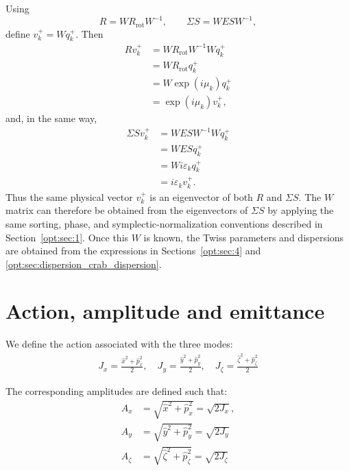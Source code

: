 Using
\begin{equation}
R = W R_{\mathrm{rot}} W^{-1}, \qquad \Sigma S = W E S W^{-1},
\end{equation}
define $v_k^+=W q_k^+$. Then
\begin{align}
R v_k^+
&= W R_{\mathrm{rot}} W^{-1} W q_k^+ \nonumber\\
&= W R_{\mathrm{rot}} q_k^+ \nonumber\\
&= W \exp(i\mu_k) q_k^+ \nonumber\\
&= \exp(i\mu_k) v_k^+,
\end{align}
and, in the same way,
\begin{align}
\Sigma S v_k^+
&= W E S W^{-1} W q_k^+ \nonumber\\
&= W E S q_k^+ \nonumber\\
&= W i\varepsilon_k q_k^+ \nonumber\\
&= i\varepsilon_k v_k^+.
\end{align}
Thus the same physical vector $v_k^+$ is an eigenvector of both $R$ and
$\Sigma S$. The $W$ matrix can therefore be obtained from the eigenvectors of
$\Sigma S$ by applying the same sorting, phase, and symplectic-normalization
conventions described in Section~\ref{opt:sec:1}. Once this $W$ is known, the
Twiss parameters and dispersions are obtained from the expressions in
Sections~\ref{opt:sec:4} and \ref{opt:sec:dispersion_crab_dispersion}.

\section{Action, amplitude and emittance}

We define the action associated with the three modes:
\begin{align}
J_x = \frac{\hat{x}^2 + \hat{p}^2_x}{2},
\quad
J_y = \frac{\hat{y}^2 + \hat{p}^2_y}{2},
\quad
J_\zeta = \frac{\hat{\zeta}^2 + \hat{p}^2_\zeta}{2}
\label{eq:action}
\end{align}

The corresponding amplitudes are defined such that:
\begin{align}
A_x &= \sqrt{\hat{x}^2 + \hat{p}^2_x} = \sqrt{2J_x}, \label{eq:ampl_x}\\
A_y &= \sqrt{\hat{y}^2 + \hat{p}^2_y} = \sqrt{2J_y}\\
A_\zeta &= \sqrt{\hat{\zeta}^2 + \hat{p}^2_\zeta} = \sqrt{2J_\zeta}
\end{align}

